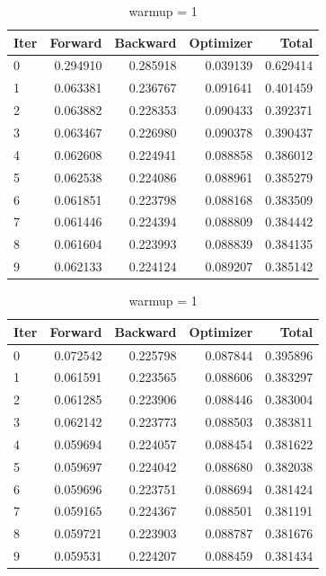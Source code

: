 \documentclass[11pt]{article}
\begin{document}
\begin{table}[H]
\centering
\caption{Warm-up effect on the large model (969M params, seconds).}
\label{tab:warmup-effect}

\begin{subtable}{\textwidth}
\centering
\caption{warmup = 0}
\begin{tabular}{lrrrr}
  \toprule
  Iter & Forward & Backward & Optimizer & Total \\
  \midrule
  0 & 0.294910 & 0.285918 & 0.039139 & 0.629414 \\
  1 & 0.063381 & 0.236767 & 0.091641 & 0.401459 \\
  2 & 0.063882 & 0.228353 & 0.090433 & 0.392371 \\
  3 & 0.063467 & 0.226980 & 0.090378 & 0.390437 \\
  4 & 0.062608 & 0.224941 & 0.088858 & 0.386012 \\
  5 & 0.062538 & 0.224086 & 0.088961 & 0.385279 \\
  6 & 0.061851 & 0.223798 & 0.088168 & 0.383509 \\
  7 & 0.061446 & 0.224394 & 0.088809 & 0.384442 \\
  8 & 0.061604 & 0.223993 & 0.088839 & 0.384135 \\
  9 & 0.062133 & 0.224124 & 0.089207 & 0.385142 \\
  \bottomrule
\end{tabular}
\end{subtable}

\vspace{0.5em}

\begin{subtable}{\textwidth}
\centering
\caption{warmup = 1}
\begin{tabular}{lrrrr}
  \toprule
  Iter & Forward & Backward & Optimizer & Total \\
  \midrule
  0 & 0.072542 & 0.225798 & 0.087844 & 0.395896 \\
  1 & 0.061591 & 0.223565 & 0.088606 & 0.383297 \\
  2 & 0.061285 & 0.223906 & 0.088446 & 0.383004 \\
  3 & 0.062142 & 0.223773 & 0.088503 & 0.383811 \\
  4 & 0.059694 & 0.224057 & 0.088454 & 0.381622 \\
  5 & 0.059697 & 0.224042 & 0.088680 & 0.382038 \\
  6 & 0.059696 & 0.223751 & 0.088694 & 0.381424 \\
  7 & 0.059165 & 0.224367 & 0.088501 & 0.381191 \\
  8 & 0.059721 & 0.223903 & 0.088787 & 0.381676 \\
  9 & 0.059531 & 0.224207 & 0.088459 & 0.381434 \\
  \bottomrule
\end{tabular}
\end{subtable}


\end{table}
\end{document}
